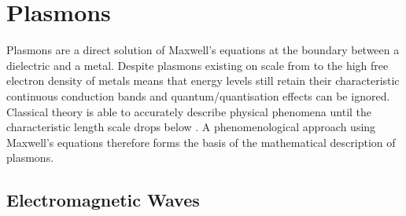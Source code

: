 \documentclass{article}
\begin{document}
\section{Plasmons}
\label{sec:plasmons}

Plasmons are a direct solution of Maxwell's equations at the boundary between a dielectric and a metal. Despite plasmons existing on scale from  to  the high free electron density of metals means that energy levels still retain their characteristic continuous conduction bands and {\color{red}quantum/quantisation} effects can be ignored. Classical theory is able to accurately describe physical phenomena until the characteristic length scale drops below . A phenomenological approach using Maxwell's equations \cite{maxwell1865} therefore forms the basis of the mathematical description of plasmons.

\subsection{Electromagnetic Waves}
\label{sec:em_waves}
\end{document}
